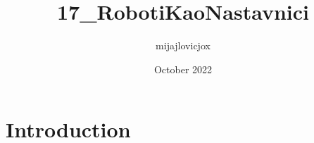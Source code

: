 \documentclass{article}
\title{17_RobotiKaoNastavnici}
\author{mijajlovicjox }
\date{October 2022}
\begin{document}
\maketitle

\section{Introduction}
\end{document}

